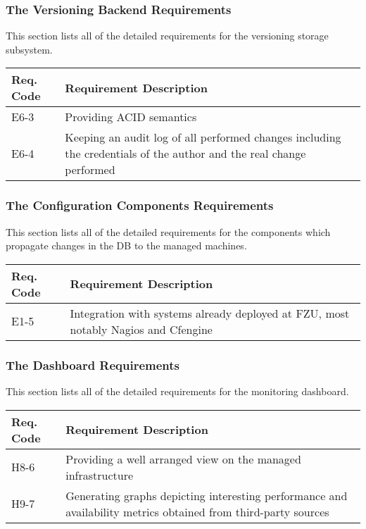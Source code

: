 \documentclass[12pt]{article}
\begin{document}
\subsubsection{The Versioning Backend Requirements}
This section lists all of the detailed requirements for the versioning storage subsystem.

\begin{center}
	\begin{tabular}{| p{2.5cm} | p{12.5cm} |}
	 	\hline
		\textbf{Req. Code} & \textbf{Requirement Description}\\
		\hline
        E6-3    & Providing ACID semantics\\
		\hline
        E6-4    & Keeping an audit log of all performed changes including the credentials
                  of the author and the real change performed\\
        \hline
	\end{tabular}
	\label{tab:VersioningBackendRequirements}
\end{center}

\subsubsection{The Configuration Components Requirements}
This section lists all of the detailed requirements for the components which propagate changes in the DB to the managed machines.

\begin{center}
	\begin{tabular}{| p{2.5cm} | p{12.5cm} |}
	 	\hline
		\textbf{Req. Code} & \textbf{Requirement Description}\\
		\hline
        E1-5    & Integration with systems already deployed at FZU, most notably Nagios and Cfengine\\
        \hline
	\end{tabular}
	\label{tab:ConfigurationComponentsRequirements}
\end{center}


\subsubsection{The Dashboard Requirements}
This section lists all of the detailed requirements for the monitoring dashboard.

\begin{center}
	\begin{tabular}{| p{2.5cm} | p{12.5cm} |}
	 	\hline
		\textbf{Req. Code} & \textbf{Requirement Description}\\
		\hline
        H8-6    &   Providing a well arranged view on the managed infrastructure\\
		\hline
        H9-7    &   Generating graphs depicting interesting performance and availability
                    metrics obtained from third-party sources\\
        \hline
	\end{tabular}
	\label{tab:DashboardRequirements}
\end{center}
\end{document}
